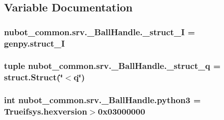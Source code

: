 \subsection{Variable Documentation}
\hypertarget{namespacenubot__common_1_1srv_1_1__BallHandle_ab2af3865598445d74f9f6f9dd829fbab}{
\subsubsection[{\-\_\-struct\-\_\-\-I}]{\setlength{\rightskip}{0pt plus 5cm}nubot\-\_\-common.\-srv.\-\_\-\-Ball\-Handle.\-\_\-struct\-\_\-\-I = genpy.\-struct\-\_\-\-I}}\label{namespacenubot__common_1_1srv_1_1__BallHandle_ab2af3865598445d74f9f6f9dd829fbab}
\hypertarget{namespacenubot__common_1_1srv_1_1__BallHandle_a0a6e3fbd722e66ea563734cefc28ef12}{
\subsubsection[{\-\_\-struct\-\_\-q}]{\setlength{\rightskip}{0pt plus 5cm}tuple nubot\-\_\-common.\-srv.\-\_\-\-Ball\-Handle.\-\_\-struct\-\_\-q = struct.\-Struct(\char`\"{}$<$q\char`\"{})}}\label{namespacenubot__common_1_1srv_1_1__BallHandle_a0a6e3fbd722e66ea563734cefc28ef12}
\hypertarget{namespacenubot__common_1_1srv_1_1__BallHandle_a5b43d243eb270a053a02014aebbe0b57}{
\subsubsection[{python3}]{\setlength{\rightskip}{0pt plus 5cm}int nubot\-\_\-common.\-srv.\-\_\-\-Ball\-Handle.\-python3 = Trueifsys.\-hexversion$>$0x03000000}}\label{namespacenubot__common_1_1srv_1_1__BallHandle_a5b43d243eb270a053a02014aebbe0b57}
